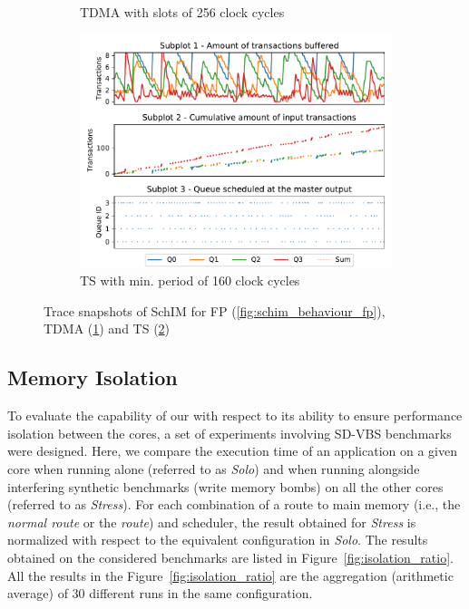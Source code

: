 \begin{figure}[t]
\begin{subfigure}{0.45\textwidth}
        \caption{TDMA with slots of 256 clock cycles}
        \label{fig:schim_behaviour_tdma}
      \end{subfigure}
      \hfill
      \begin{subfigure}{0.45\textwidth}
        \centering
        \includegraphics[scale=0.45]{images/SchIM_TS_buffering.pdf}
        \caption{TS with min. period of 160 clock cycles}
        \label{fig:schim_behaviour_mg}
      \end{subfigure}
      \caption{Trace snapshots of SchIM for FP (\ref{fig:schim_behaviour_fp}), TDMA (\ref{fig:schim_behaviour_tdma}) and TS (\ref{fig:schim_behaviour_mg})}
      \label{fig:schim_behaviour}
    \end{figure}

\subsection{Memory Isolation}
\label{subsec:isolation}
To evaluate the capability of our \schim with respect to its ability to
ensure performance isolation between the cores, a set of experiments
involving SD-VBS benchmarks were designed. Here, we compare the
execution time of an application on a given core when running alone
(referred to as \emph{Solo}) and when running alongside interfering synthetic
benchmarks (write memory bombs) on all the other cores (referred to as
\emph{Stress}).
For each combination of a route to main memory (i.e., the \emph{normal
route} or the \emph{\schim route}) and scheduler, the result obtained
for \emph{Stress} is normalized with respect to the equivalent configuration
in \emph{Solo}.
The results obtained on the considered benchmarks are listed in
Figure~\ref{fig:isolation_ratio}. All the results in the
Figure~\ref{fig:isolation_ratio} are the aggregation (arithmetic average)
of 30 different runs in the same configuration.

